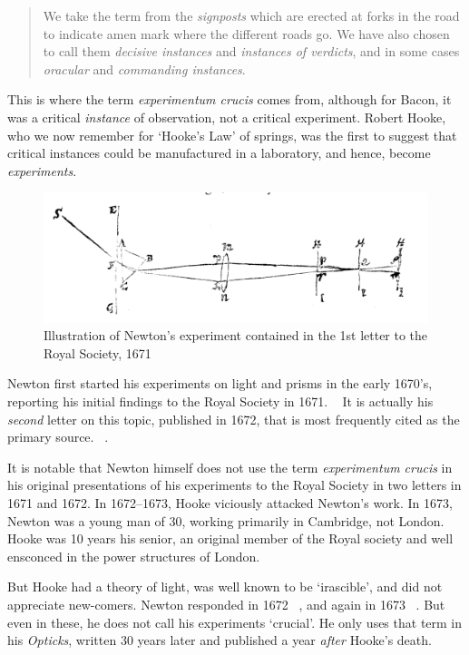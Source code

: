 \begin{refsection}
\begin{quote}
We take the term from the \emph{signposts} which are erected at forks in the road to indicate amen mark where the different roads go. We have also chosen to call them \emph{decisive instances} and \emph{instances of verdicts}, and in some cases \emph{oracular} and \emph{commanding instances}. 
\end{quote}

This is where the term \emph{experimentum crucis} comes from, although for Bacon, it was a critical \emph{instance} of observation, not a critical experiment. Robert Hooke, who we now remember for ‘Hooke’s Law’ of springs, was the first to suggest that critical instances could be manufactured in a laboratory, and hence, become \emph{experiments}.

\begin{figure}\includegraphics{../images/newton1671.png}\caption{Illustration of Newton's experiment contained in the 1st letter to the Royal Society, 1671}\label{fig:newton1671}\end{figure}

Newton first started his experiments on light and prisms in the early 1670’s, reporting his initial findings to the Royal Society in 1671. ~\citep{Newton:1671uw} It is actually his \emph{second} letter on this topic, published in 1672, that is most frequently cited as the primary source. ~\citep{Newton:1672tm}. 

It is notable that Newton himself does not use the term \emph{experimentum crucis} in his original presentations of his experiments to the Royal Society in two letters in 1671 and 1672. In 1672--1673, Hooke viciously attacked Newton’s work. In 1673, Newton was a young man of 30, working primarily in Cambridge, not London. Hooke was 10 years his senior, an original member of the Royal society and well ensconced in the power structures of London.

But Hooke had a theory of light, was well known to be ‘irascible’, and did not appreciate new-comers. Newton responded in 1672 ~\citep{Newton:1672wd}, and again in 1673 ~\citep{Newton:1673tf}. But even in these, he does not call his experiments ‘crucial’. He only uses that term in his \emph{Opticks}, written 30 years later and published a year \emph{after} Hooke’s death. ~\citep{Newton:2018th}


\end{refsection}
